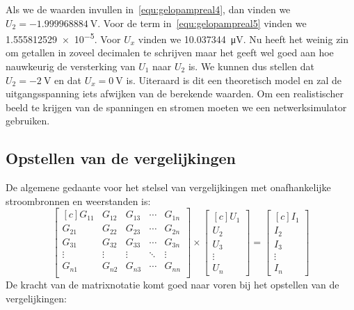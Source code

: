 \begin{example}
Als we de waarden invullen in~\eqref{equ:gelopampreal4}, dan vinden we $U_2 = \SI{-1.999968884}{\volt}$. Voor de term in~\eqref{equ:gelopampreal5} vinden we \num{1.555812529e-5}. Voor $U_x$ vinden we \SI{10.037344}{\micro\volt}. Nu heeft het weinig zin om getallen in zoveel decimalen te schrijven maar het geeft wel goed aan hoe nauwkeurig de versterking van $U_1$ naar $U_2$ is. We kunnen dus stellen dat $U_2 = \SI{-2}{\volt}$ en dat $U_x = \SI{0}{\volt}$ is. Uiteraard is dit een theoretisch model en zal de uitgangsspanning iets afwijken van de berekende waarden. Om een realistischer beeld te krijgen van de spanningen en stromen moeten we een netwerksimulator gebruiken.


\end{example}

\subsection{Opstellen van de vergelijkingen}
De algemene gedaante voor het stelsel van vergelijkingen met onafhankelijke stroombronnen en weerstanden is:
%
\begin{equation}
\begin{bmatrix*}[c]
G_{11} & G_{12} & G_{13} & \cdots & G_{1n} \\
G_{21} & G_{22} & G_{23} & \cdots & G_{2n} \\
G_{31} & G_{32} & G_{33} & \cdots & G_{3n} \\
\vdots & \vdots & \vdots & \ddots & \vdots \\
G_{n1} & G_{n2} & G_{n3} & \cdots & G_{nn} \\
\end{bmatrix*} \times
\begin{bmatrix*}[c]
U_1 \\ U_2 \\ U_3 \\ \vdots \\ U_n
\end{bmatrix*} =
\begin{bmatrix*}[c]
I_1 \\ I_2 \\ I_3 \\ \vdots \\ I_n
\end{bmatrix*}
\end{equation}
%
De kracht van de matrixnotatie komt goed naar voren bij het opstellen van de vergelijkingen:

